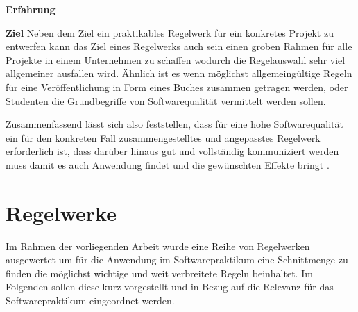 \documentclass[da,ngerman]{stthesis}
\begin{document}
\begin{labeling}{\textbf{Erfahrung}}
				  \item [\textbf{Ziel}] Neben dem Ziel ein praktikables Regelwerk für ein konkretes Projekt zu entwerfen kann das Ziel eines Regelwerks auch sein einen groben Rahmen für alle Projekte in einem Unternehmen zu schaffen wodurch die Regelauswahl sehr viel allgemeiner ausfallen wird. Ähnlich ist es wenn möglichst allgemeingültige Regeln für eine Veröffentlichung in Form eines Buches zusammen getragen werden, oder Studenten die Grundbegriffe von Softwarequalität vermittelt werden sollen.
			\end{labeling}
			Zusammenfassend lässt sich also feststellen, dass für eine hohe Softwarequalität ein für den konkreten Fall zusammengestelltes und angepasstes Regelwerk erforderlich ist, dass darüber hinaus gut und vollständig kommuniziert werden muss damit es auch Anwendung findet und die gewünschten Effekte bringt \cite{ImproveCodeQuality}.
		\section{Regelwerke}
			Im Rahmen der vorliegenden Arbeit wurde eine Reihe von Regelwerken ausgewertet um für die Anwendung im Softwarepraktikum eine Schnittmenge zu finden die möglichst wichtige und weit verbreitete Regeln beinhaltet. Im Folgenden sollen diese kurz vorgestellt und in Bezug auf die Relevanz für das Softwarepraktikum eingeordnet werden.
\end{document}
